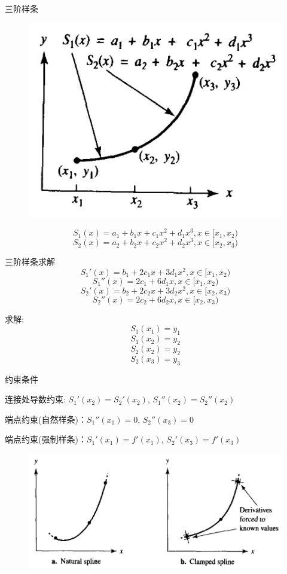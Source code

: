 \documentclass[UTF8]{ctexbeamer}
\begin{document}
\begin{frame}{三阶样条}
  \begin{figure}
    \centering{}
    \includegraphics[width=.4\textwidth{}]{cubic-spline.png}
  \end{figure}
  \[
  S_1(x) = a_1 + b_1x + c_1x^2+d_1x^3, x \in [x_1, x_2)
  \]
  \[
  S_2(x) = a_2 + b_2x + c_2x^2+d_2x^3, x \in [x_2, x_3)
  \]
  
\end{frame}

\begin{frame}{三阶样条求解}
  \[
  S_1'(x) = b_1 + 2c_1x+3d_1x^2, x \in [x_1, x_2)
  \]
  \[
  S_1''(x) = 2c_1+6d_1x, x \in [x_1, x_2)
  \]
  \[
  S_2'(x) = b_2 + 2c_2x+3d_2x^2, x \in [x_2, x_3)
  \]
  \[
  S_2''(x) = 2c_2+6d_2x, x \in [x_2, x_3)
  \]

  求解:
  \[
  S_1(x_1) = y_1
  \]
  \[
  S_1(x_2) = y_2
  \]
  \[
  S_2(x_2) = y_2
  \]
  \[
  S_2(x_3) = y_3
  \]
  
\end{frame}

\begin{frame}{约束条件}

  连接处导数约束: $S_1'(x_2) = S_2'(x_2)$, $S_1''(x_2) = S_2''(x_2)$

  端点约束(自然样条)：$S_1''(x_1) = 0$, $S_2''(x_3) = 0$

  端点约束(强制样条)：$S_1'(x_1) = f'(x_1)$, $S_2'(x_3) = f'(x_3)$

  \begin{figure}
    \centering{}
    \includegraphics[width=.7\textwidth{}]{spline-border.png}
  \end{figure}
  
\end{frame}
\end{document}
